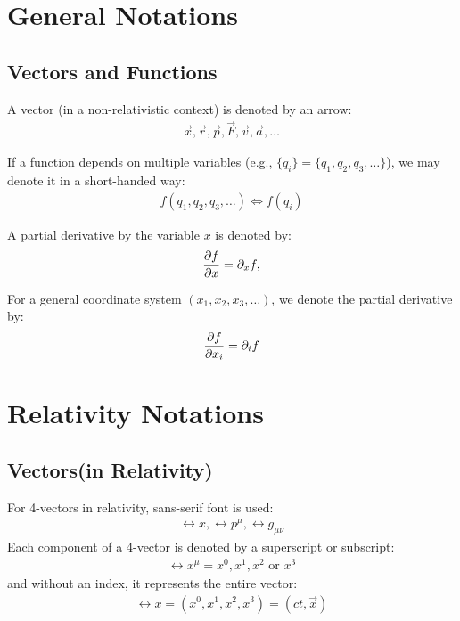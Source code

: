 \section{General Notations}
\label{sec:notations}
\subsection{Vectors and Functions}
A vector (in a non-relativistic context) is denoted by an arrow:
\begin{align}
  \vec{x}, \vec{r}, \vec{p}, \vec{F}, \vec{v}, \vec{a}, \ldots
\end{align}

If a function depends on multiple variables (e.g., $\{q_i\} = \{q_1, q_2, q_3, \ldots\}$), we may denote it in a short-handed way:
\begin{align}
  f(q_1, q_2, q_3, \ldots) \iff f(q_i)
\end{align}

A partial derivative by the variable $x$ is denoted by:
\begin{align}
  \pdv{f}{x} = \pdif{x} f,
\end{align}

For a general coordinate system $(x_1, x_2, x_3, \ldots)$, we denote the partial derivative by:
\begin{align}
  \pdv{f}{x_i} = \pdif{i} f
\end{align}

\section{Relativity Notations}
\subsection{Vectors(in Relativity)}
For 4-vectors in relativity, sans-serif font is used:
\begin{align}
  \rel{x}, \rel{p}^\mu, \rel{g}_{\mu \nu}
\end{align}
Each component of a 4-vector is denoted by a superscript or subscript:
\begin{align}
  \rel{x}^\mu = x^0, x^1, x^2 \text{ or } x^3
\end{align}
and without an index, it represents the entire vector:
\begin{align}
  \rel{x} = (x^0, x^1, x^2, x^3) = (ct, \vec{x})
\end{align}


